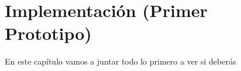 \chapter{Implementación \newline (Primer Prototipo)}\label{ch:Implementación}
En este capítulo vamos a juntar todo lo primero a ver si deberás
